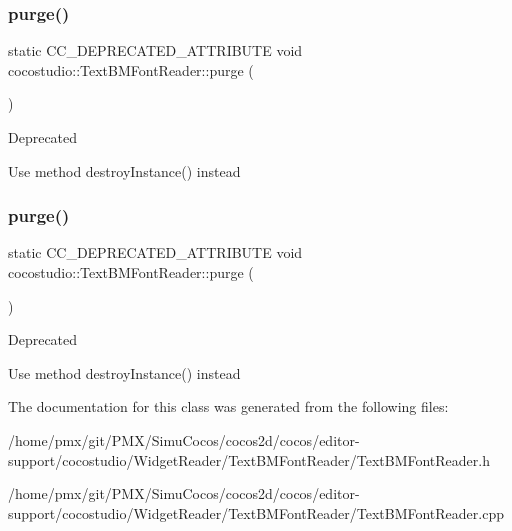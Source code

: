 \subsubsection{\texorpdfstring{purge()}{purge()}\hspace{0.1cm}{\footnotesize\ttfamily [1/2]}}
{\footnotesize\ttfamily static C\+C\+\_\+\+D\+E\+P\+R\+E\+C\+A\+T\+E\+D\+\_\+\+A\+T\+T\+R\+I\+B\+U\+TE void cocostudio\+::\+Text\+B\+M\+Font\+Reader\+::purge (\begin{DoxyParamCaption}{ }\end{DoxyParamCaption})\hspace{0.3cm}{\ttfamily [static]}}

\begin{DoxyRefDesc}{Deprecated}
\item[\hyperlink{deprecated__deprecated000108}{Deprecated}]Use method destroy\+Instance() instead \end{DoxyRefDesc}
\mbox{\label{classcocostudio_1_1TextBMFontReader_a817fe5ac71dc5dd9de811d70f209dc28}} 
\subsubsection{\texorpdfstring{purge()}{purge()}\hspace{0.1cm}{\footnotesize\ttfamily [2/2]}}
{\footnotesize\ttfamily static C\+C\+\_\+\+D\+E\+P\+R\+E\+C\+A\+T\+E\+D\+\_\+\+A\+T\+T\+R\+I\+B\+U\+TE void cocostudio\+::\+Text\+B\+M\+Font\+Reader\+::purge (\begin{DoxyParamCaption}{ }\end{DoxyParamCaption})\hspace{0.3cm}{\ttfamily [static]}}

\begin{DoxyRefDesc}{Deprecated}
\item[\hyperlink{deprecated__deprecated000343}{Deprecated}]Use method destroy\+Instance() instead \end{DoxyRefDesc}


The documentation for this class was generated from the following files\+:\begin{DoxyCompactItemize}
\item 
/home/pmx/git/\+P\+M\+X/\+Simu\+Cocos/cocos2d/cocos/editor-\/support/cocostudio/\+Widget\+Reader/\+Text\+B\+M\+Font\+Reader/Text\+B\+M\+Font\+Reader.\+h\item 
/home/pmx/git/\+P\+M\+X/\+Simu\+Cocos/cocos2d/cocos/editor-\/support/cocostudio/\+Widget\+Reader/\+Text\+B\+M\+Font\+Reader/Text\+B\+M\+Font\+Reader.\+cpp\end{DoxyCompactItemize}
